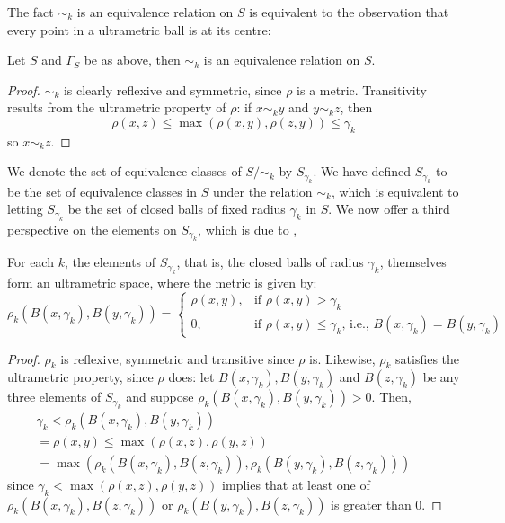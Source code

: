 The fact $\sim_k$ is an equivalence relation on $S$ is equivalent to the observation that every point in a ultrametric ball is at its centre:

\begin{lemma*}
Let  $S$ and $\Gamma_S$ be as above, then $\sim_k$ is an equivalence relation on $S$.
\end{lemma*}

\begin{proof}
$\sim_k$ is clearly reflexive and symmetric, since $\rho$ is a metric. Transitivity results from the ultrametric property of $\rho$: if $x \sim_k y$ and $y \sim_k z$, then $$\rho(x, z) \leq \max(\rho(x,y), \rho(z,y)) \leq \gamma_k$$ so $x \sim_k z$. 
\end{proof}

 We denote the set of equivalence classes of $S/\sim_k$ by $S_{\gamma_k}$. We have defined  $S_{\gamma_k}$ to be the set of equivalence classes in $S$ under the relation $\sim_k$, which is equivalent to letting $S_{\gamma_k}$ be the set of closed balls of fixed radius $\gamma_k$ in  $S$. We now offer a third perspective on the elements on $S_{\gamma_k}$, which is due to \cite{na},

\begin{lemma*}
For each $k$, the elements of $S_{\gamma_k}$, that is, the closed balls of radius $\gamma_k$, themselves form an ultrametric space, where the metric is given by:
\[ \rho_k(B(x, \gamma_k),B(y, \gamma_k)) = 
\begin{cases}
\rho(x,y), & \text{if } \rho(x,y) > \gamma_k \\
0, & \text{if }   \rho(x,y) \leq \gamma_k \text{, i.e., } B(x, \gamma_k)=B(y, \gamma_k)
\end{cases}
\]
\end{lemma*}

\begin{proof}
$\rho_k$ is reflexive, symmetric and transitive since $\rho$ is. Likewise, $\rho_k$ satisfies the ultrametric property, since $\rho$ does: let $B(x, \gamma_k),B(y, \gamma_k)$ and $B(z, \gamma_k)$ be any three elements of $S_{\gamma_k}$ and suppose $\rho_k(B(x, \gamma_k),B(y, \gamma_k)) > 0 $. Then,
\begin{align*}
\gamma_k < \rho_k(B(x, \gamma_k),B(y, \gamma_k)) && \\
= \rho(x,y) \leq \max(\rho(x,z), \rho(y,z)) && \\
= \max(\rho_k(B(x, \gamma_k), B(z, \gamma_k)), \rho_k(B(y, \gamma_k),B(z,\gamma_k)))
\end{align*}
since $ \gamma_k < \max(\rho(x,z), \rho(y,z))$ implies that at least one of $\rho_k(B(x, \gamma_k), B(z, \gamma_k))$ or $\rho_k(B(y, \gamma_k),B(z,\gamma_k))$ is greater than $0$.
\end{proof}

